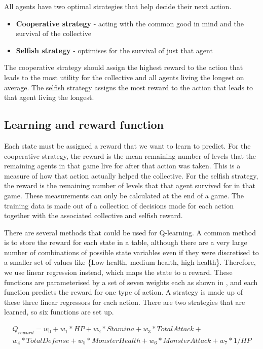 All agents have two optimal strategies that help decide their next action.
\begin{itemize}
    \item \textbf{Cooperative strategy} - acting with the common good in mind and the survival of the collective
    \item \textbf{Selfish strategy} - optimises for the survival of just that agent
\end{itemize}
The cooperative strategy should assign the highest reward to the action that leads to the most utility for the collective and all agents living the longest on average. The selfish strategy assigns the most reward to the action that leads to that agent living the longest.

\subsection{Learning and reward function}
Each state must be assigned a reward that we want to learn to predict. For the cooperative strategy, the reward is the mean remaining number of levels that the remaining agents in that game live for after that action was taken. This is a measure of how that action actually helped the collective. For the selfish strategy, the reward is the remaining number of levels that that agent survived for in that game. These measurements can only be calculated at the end of a game. The training data is made out of a collection of decisions made for each action together with the associated collective and selfish reward.

There are several methods that could be used for Q-learning. A common method is to store the reward for each state in a table, although there are a very large number of combinations of possible state variables even if they were discretised to a smaller set of values like \{Low health, medium health, high health\}. Therefore, we use linear regression instead, which maps the state to a reward. These functions are parameterised by a set of seven weights each as shown in , and each function predicts the reward for one type of action. A strategy is made up of these three linear regressors for each action. There are two strategies that are learned, so six functions are set up. 

\begin{equation}
\begin{aligned}
Q_{reward} = w_0 + w_1 * HP + w_2 * Stamina + w_3 * TotalAttack + \\
w_4 * TotalDefense + w_5 * MonsterHealth + w_6 * MonsterAttack + w_7 * 1 / HP
\end{aligned}
\end{equation}

